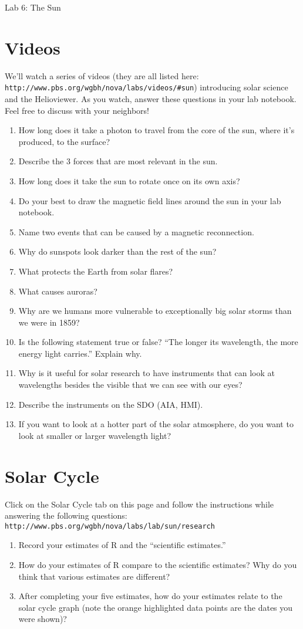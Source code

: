 \documentclass[11pt]{article}%
\begin{document}
\begin{center}
\huge Lab 6: The Sun
\end{center}
	

\section*{Videos}
We'll watch a series of videos (they are all listed here: {\tt http://www.pbs.org/wgbh/nova/labs/videos/\#sun}) introducing solar science and the Helioviewer. As you watch, answer these questions in your lab notebook. Feel free to discuss with your neighbors!
\begin{enumerate}
\item How long does it take a photon to travel from the core of the sun, where it's produced, to the surface?
\item Describe the 3 forces that are most relevant in the sun.
\item How long does it take the sun to rotate once on its own axis?
\item Do your best to draw the magnetic field lines around the sun in your lab notebook. 
\item Name two events that can be caused by a magnetic reconnection.
\item Why do sunspots look darker than the rest of the sun?
\item What protects the Earth from solar flares?
\item What causes auroras?
\item Why are we humans more vulnerable to exceptionally big solar storms than we were in 1859?
\item Is the following statement true or false? ``The longer its wavelength, the more energy light carries.'' Explain why.
\item Why is it useful for solar research to have instruments that can look at wavelengths besides the visible that we can see with our eyes?
\item Describe the instruments on the SDO (AIA, HMI).
\item If you want to look at a hotter part of the solar atmosphere, do you want to look at smaller or larger wavelength light?
\end{enumerate}

\section*{Solar Cycle}
Click on the Solar Cycle tab on this page and follow the instructions while answering the following questions: {\tt http://www.pbs.org/wgbh/nova/labs/lab/sun/research}
\begin{enumerate}
\item Record your estimates of R and the ``scientific estimates.''
 \item How do your estimates of R compare to the scientific estimates? Why do you think that various estimates are different?
 \item  After completing your five estimates, how do your estimates relate to the solar cycle graph (note the orange highlighted data points are the dates you were shown)?\end{enumerate}
\end{document}
